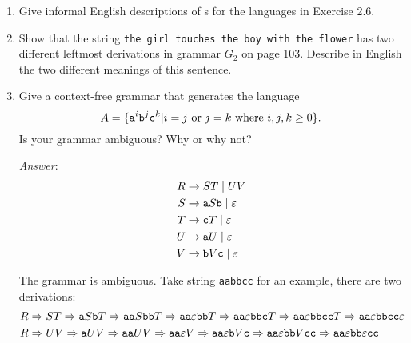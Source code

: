 \begin{enumerate}[font=\bfseries,label=2.\arabic*]
\begin{enumerate}[font=\bfseries,label=\alph*.]
\end{enumerate}


\item Give informal English descriptions of \pda s for the languages in Exercise 2.6.


\item Show that the string {\tt the girl touches the boy with the flower} has two different leftmost derivations in grammar $G_2$ on page 103. Describe in English the two different meanings of this sentence.


\item Give a context-free grammar that generates the language
$$A = \{{\tt a}^i {\tt b}^j {\tt c}^k | i = j \text{ or } j = k \text{ where } i, j, k\ge 0\}. $$
Is your grammar ambiguous? Why or why not?

\emph{Answer}:
\begin{align*}
    R &\rightarrow ST \mid UV \\
    S &\rightarrow {\tt a}S{\tt b} \mid \varepsilon \\
    T &\rightarrow {\tt c}T \mid \varepsilon \\
    U &\rightarrow {\tt a}U \mid \varepsilon \\
    V &\rightarrow {\tt b}V{\tt c} \mid \varepsilon
\end{align*}

The grammar is ambiguous. Take string {\tt aabbcc} for an example, there are two derivations:
\begin{align*}
    R &\Rightarrow ST\Rightarrow {\tt a}S{\tt b}T\Rightarrow {\tt aa}S{\tt bb}T
       \Rightarrow {\tt aa}\varepsilon{\tt bb}T \Rightarrow {\tt aa}\varepsilon{\tt bbc}T
       \Rightarrow {\tt aa}\varepsilon{\tt bbcc}T \Rightarrow {\tt aa}\varepsilon{\tt bbcc}\varepsilon\\
    R &\Rightarrow UV\Rightarrow {\tt a}UV\Rightarrow {\tt aa}UV
       \Rightarrow {\tt aa}\varepsilon V\Rightarrow {\tt aa}\varepsilon {\tt b}V{\tt c}
       \Rightarrow {\tt aa}\varepsilon {\tt bb}V{\tt cc}
       \Rightarrow {\tt aa}\varepsilon {\tt bb}\varepsilon {\tt cc}
\end{align*}



\end{enumerate}
